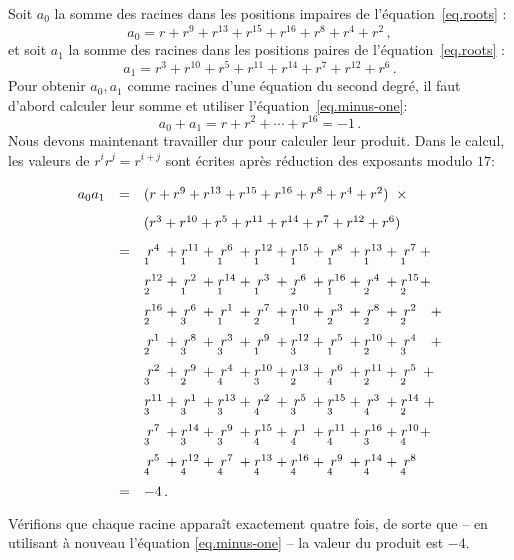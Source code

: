 Soit $a_0$ la somme des racines dans les positions impaires de l'équation~\ref{eq.roots} :
\[
a_0=r + r^9 + r^{13} +r^{15} +r^{16} + r^8+r^4+r^2\,,
\]
et soit $a_1$ la somme des racines dans les positions paires de l'équation~\ref{eq.roots} :
\[
a_1=r^3 + r^{10} + r^{5} +r^{11} +r^{14} + r^7+r^{12}+r^6\,.
\]
Pour obtenir $a_0,a_1$ comme racines d'une équation du second degré, il faut d'abord calculer leur somme et utiliser l'équation~\ref{eq.minus-one}:
\[
a_0+a_1=r + r^2 + \cdots +r^{16}=-1\,.
\]
Nous devons maintenant travailler  dur pour calculer leur produit. Dans le calcul, les valeurs de $r^ir^j=r^{i+j}$ sont écrites après réduction des exposants modulo $17$:
\[
\renewcommand{\arraystretch}{1.7}
\begin{array}{lcl}
a_0a_1&=&(r + r^9 + r^{13} +r^{15} +r^{16} + r^8+r^4+r^2)\;\;\times\\
&&(r^3 + r^{10} + r^{5} +r^{11} +r^{14} + r^7+r^{12}+r^6)\\
&=&\occ{4}{1} + \occ{11}{1} + \occ{6}{1} + \occ{12}{1} + \occ{15}{1} + \occ{8}{1} + \occ{13}{1} + \occ{7}{1} +\\
&&\occ{12}{2} + \occ{2}{1} + \occ{14}{1} + \occ{3}{1} + \occ{6}{2} + \occ{16}{1} + \occ{4}{2} + \occ{15}{2} +\\
&&\occ{16}{2} + \occ{6}{3} + \occ{1}{1} + \occ{7}{2} + \occ{10}{1} + \occ{3}{2} + \occ{8}{2} + \occ{2}{2}\;\;\: +\\
&&\occ{1}{2} + \occ{8}{3} + \occ{3}{3} + \occ{9}{1} + \occ{12}{3} + \occ{5}{1} + \occ{10}{2} + \occ{4}{3}\;\;\: +\\
&&\occ{2}{3} + \occ{9}{2} + \occ{4}{4} + \occ{10}{3} + \occ{13}{2} + \occ{6}{4} + \occ{11}{2} + \occ{5}{2} \:+\\
&&\occ{11}{3} + \occ{1}{3} + \occ{13}{3} + \occ{2}{4} + \occ{5}{3} + \occ{15}{3} + \occ{3}{4} + \occ{14}{2} \;+\\
&&\occ{7}{3} + \occ{14}{3} + \occ{9}{3} + \occ{15}{4} + \occ{1}{4} + \occ{11}{4} + \occ{16}{3} + \occ{10}{4} +\\
&&\occ{5}{4} + \occ{12}{4} + \occ{7}{4} + \occ{13}{4} + \occ{16}{4} + \occ{9}{4} + \occ{14}{4} + \occ{8}{4}\\
&=&-4\,.
\end{array}
\]
Vérifions que chaque racine apparaît exactement quatre fois, de sorte que -- en utilisant à nouveau l'équation \ref{eq.minus-one} -- la valeur du produit est $-4$.


